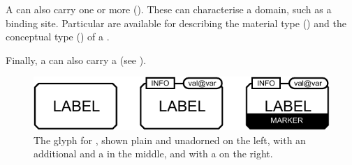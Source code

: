 \begin{glyphDescription}
A  can also carry one or more  ().
These can characterise a domain, such as a binding site.
Particular  are available for describing the material type () and the conceptual type () of a .

Finally, a  can also carry a  (see ).

\end{glyphDescription}

\begin{figure}[H]
  \centering
  \includegraphics{images/complex-combined}
  \caption{The \PD glyph for , shown plain and unadorned on the left, with an additional  and a  in the middle, and with a  on the right.}
  \label{fig:complex}
\end{figure}


